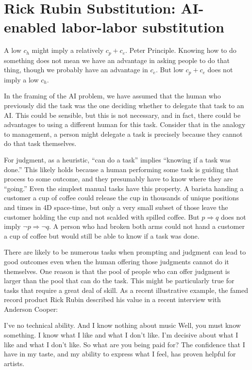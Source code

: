 \documentclass{article}
\begin{document}
\section{Rick Rubin Substitution: AI-enabled labor-labor substitution}

A low $c_h$ might imply a relatively $c_p + c_e$.
Peter Principle. 
Knowing how to do something does not mean we have an advantage in asking people to do that thing, though we probably have an advantage in $c_e$.
But low $c_p + c_e$ does not imply a low $c_h$.

In the framing of the AI problem, we have assumed that the human who previously did the task was the one deciding whether to delegate that task to an AI. 
This could be sensible, but this is not necessary, and in fact, there could be advantages to using a different human for this task.
Consider that in the analogy to management, a person might delegate a task is precisely because they cannot do that task themselves. 

For judgment, as a heuristic, ``can do a task'' implies ``knowing if a task was done.''
This likely holds because a human performing some task is guiding that process to some outcome, and they presumably have to know where they are ``going.''
Even the simplest manual tasks have this property.  
A barista handing a customer a cup of coffee could release the cup in thousands of unique positions and times in 4D space-time, but only a very small subset of those leave the customer holding the cup and not scalded with spilled coffee. 
But $p \Rightarrow q$ does not imply $\neg p \Rightarrow \neg q$.
A person who had broken both arms could not hand a customer a cup of coffee but would still be able to know if a task was done.

There are likely to be numerous tasks when prompting and judgment can lead to good outcomes even when the human offering those judgments cannot do it themselves.
One reason is that the pool of people who can offer judgment is larger than the pool that can do the task. 
This might be particularly true for tasks that require a great deal of skill.
As a recent illustrative example,  the famed record product Rick Rubin described his value in a recent interview with Anderson Cooper:
\begin{dialogue}
 I’ve no technical ability. And I know nothing about music
 Well, you must know something.
 I know what I like and what I don’t like. I’m decisive about what I like and what I don’t like.
 So what are you being paid for?
 The confidence that I have in my taste, and my ability to express what I feel, has proven helpful for artists.
\end{dialogue}
\end{document}

